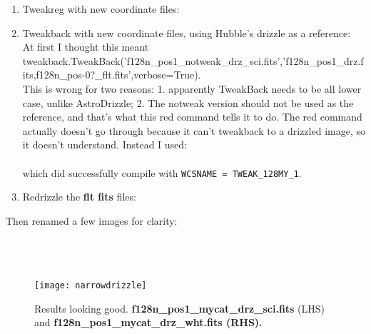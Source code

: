 \documentclass[11pt,obeyspaces]{article} %
\begin{document}
\begin{enumerate}
\item Tweakreg with new coordinate files: \\
\item Tweakback with new coordinate files, using Hubble's drizzle as a reference: \\
At first I thought this meant \\
tweakback.TweakBack('f128n\_pos1\_notweak\_drz\_sci.fits','f128n\_pos1\_drz.fits,f128n\_pos-0?\_flt.fits',verbose=True). \\
This is wrong for two reasons: 1. apparently TweakBack needs to be all lower case, unlike AstroDrizzle; 2. The notweak version should not be used as the reference, and that's what this red command tells it to do. The red command actually doesn't go through because it can't tweakback to a drizzled image, so it doesn't understand. Instead I used: \\
\\
which did successfully compile with \texttt{WCSNAME = TWEAK\_128MY\_1}.
\item Redrizzle the {\bf flt fits} files:\\
\end{enumerate}

Then renamed a few images for clarity:\\
\\
\\
\\

\begin{figure}
\centering
\texttt{[image: narrowdrizzle]}
\caption{Results looking good. {\bf f128n\_pos1\_mycat\_drz\_sci.fits} (LHS) and \bf{f128n\_pos1\_mycat\_drz\_wht.fits (RHS).}}
\label{fig:mycat}
\end{figure}
\end{document}
